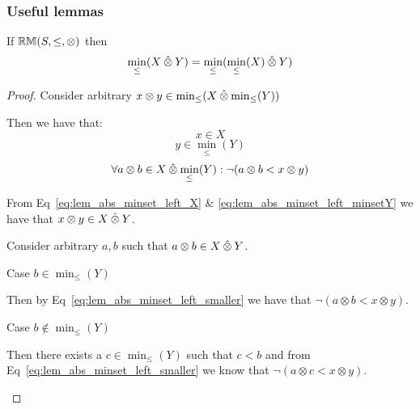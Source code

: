 \documentclass[../Summary.tex]{subfiles}
\begin{document}
\subsubsection{Useful lemmas}

\begin{lemma} \label{lem:minlift_left_absorption}
If ${\mathbb{RM}}(S,\leq,\otimes)$ then
\begin{equation*}
\min_\leq(X \mathbin{\hat{\otimes}} Y) = \min_\leq(\min_\leq(X) \mathbin{\hat{\otimes}} Y)
\end{equation*}
\end{lemma}

\begin{proof}
Consider arbitrary $x \otimes y \in \min_\leq(X \mathbin{\hat{\otimes}} \min_\leq(Y))$

\begin{ind}
Then we have that:
\begin{equation} \label{eq:lem_abs_minset_left_X}
x \in X
\end{equation}
\begin{equation} \label{eq:lem_abs_minset_left_minsetY}
y \in \min_\leq(Y)
\end{equation}
\begin{equation} \label{eq:lem_abs_minset_left_smaller}
\forall a \otimes b \in X \mathbin{\hat{\otimes}} \min_\leq(Y) : \neg (a \otimes b < x \otimes y)
\end{equation}

From Eq~\ref{eq:lem_abs_minset_left_X} \& \ref{eq:lem_abs_minset_left_minsetY} we have that $x \otimes y \in X \mathbin{\hat{\otimes}} Y$.

\vspace{0.5em}

Consider arbitrary $a, b$ such that $a \otimes b \in X \mathbin{\hat{\otimes}} Y$.
\begin{ind}
Case $b \in \min_\leq(Y)$
\begin{ind}
Then by Eq~\ref{eq:lem_abs_minset_left_smaller} we have that $\neg (a \otimes b < x \otimes y)$.
\end{ind}
Case $b \notin \min_\leq(Y)$
\begin{ind}
Then there exists a $c \in \min_\leq(Y)$ such that $c < b$ and from Eq~\ref{eq:lem_abs_minset_left_smaller} we know that $\neg (a \otimes c < x \otimes y)$.

\vspace{0.5em}


\end{ind}
\end{ind}
\end{ind}
\end{proof}
\end{document}
